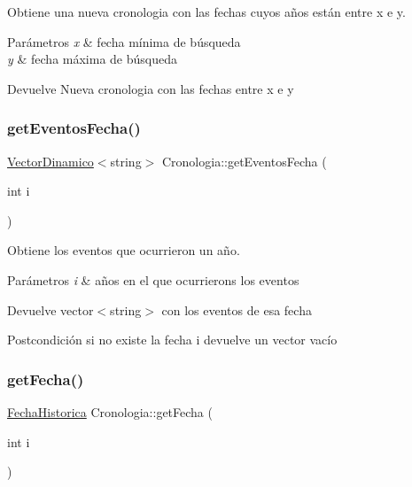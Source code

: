 Obtiene una nueva cronologia con las fechas cuyos años están entre x e y. 


\begin{DoxyParams}{Parámetros}
{\em x} & fecha mínima de búsqueda \\
\hline
{\em y} & fecha máxima de búsqueda \\
\hline
\end{DoxyParams}
\begin{DoxyReturn}{Devuelve}
Nueva cronologia con las fechas entre x e y 
\end{DoxyReturn}
\mbox{\label{classCronologia_a46137f8c227dc4184dfe9333117108de}} 
\subsubsection{\texorpdfstring{get\+Eventos\+Fecha()}{getEventosFecha()}}
{\footnotesize\ttfamily \hyperlink{classVectorDinamico}{Vector\+Dinamico}$<$string$>$ Cronologia\+::get\+Eventos\+Fecha (\begin{DoxyParamCaption}\item[{int}]{i }\end{DoxyParamCaption})}



Obtiene los eventos que ocurrieron un año. 


\begin{DoxyParams}{Parámetros}
{\em i} & años en el que ocurrierons los eventos \\
\hline
\end{DoxyParams}
\begin{DoxyReturn}{Devuelve}
vector$<$string$>$ con los eventos de esa fecha 
\end{DoxyReturn}
\begin{DoxyPostcond}{Postcondición}
si no existe la fecha i devuelve un vector vacío 
\end{DoxyPostcond}
\mbox{\label{classCronologia_a35753d158bfc5abb68c4d28078772bf1}} 
\subsubsection{\texorpdfstring{get\+Fecha()}{getFecha()}}
{\footnotesize\ttfamily \hyperlink{classFechaHistorica}{Fecha\+Historica} Cronologia\+::get\+Fecha (\begin{DoxyParamCaption}\item[{int}]{i }\end{DoxyParamCaption})}



